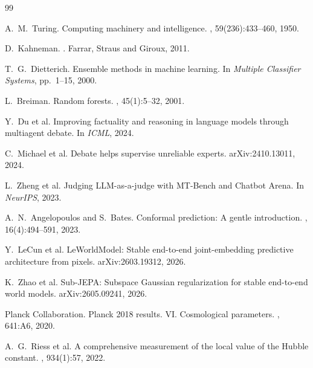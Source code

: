 \documentclass[11pt,a4paper]{article}
\begin{document}

\begin{thebibliography}{99}

 A.~M.~Turing.
\newblock Computing machinery and intelligence.
, 59(236):433--460, 1950.

 D.~Kahneman.
.
\newblock Farrar, Straus and Giroux, 2011.

 T.~G.~Dietterich.
\newblock Ensemble methods in machine learning.
\newblock In {\em Multiple Classifier Systems}, pp.~1--15, 2000.

 L.~Breiman.
\newblock Random forests.
, 45(1):5--32, 2001.

 Y.~Du et al.
\newblock Improving factuality and reasoning in language models through
  multiagent debate.
\newblock In {\em ICML}, 2024.

 C.~Michael et al.
\newblock Debate helps supervise unreliable experts.
\newblock arXiv:2410.13011, 2024.

 L.~Zheng et al.
\newblock Judging LLM-as-a-judge with MT-Bench and Chatbot Arena.
\newblock In {\em NeurIPS}, 2023.

 A.~N.~Angelopoulos and S.~Bates.
\newblock Conformal prediction: A gentle introduction.
,
  16(4):494--591, 2023.

 Y.~LeCun et al.
\newblock LeWorldModel: Stable end-to-end joint-embedding predictive
  architecture from pixels.
\newblock arXiv:2603.19312, 2026.

 K.~Zhao et al.
\newblock Sub-JEPA: Subspace Gaussian regularization for stable end-to-end world models.
\newblock arXiv:2605.09241, 2026.

 Planck Collaboration.
\newblock Planck 2018 results. VI. Cosmological parameters.
, 641:A6, 2020.

 A.~G.~Riess et al.
\newblock A comprehensive measurement of the local value of the Hubble constant.
, 934(1):57, 2022.

\end{thebibliography}
\end{document}
